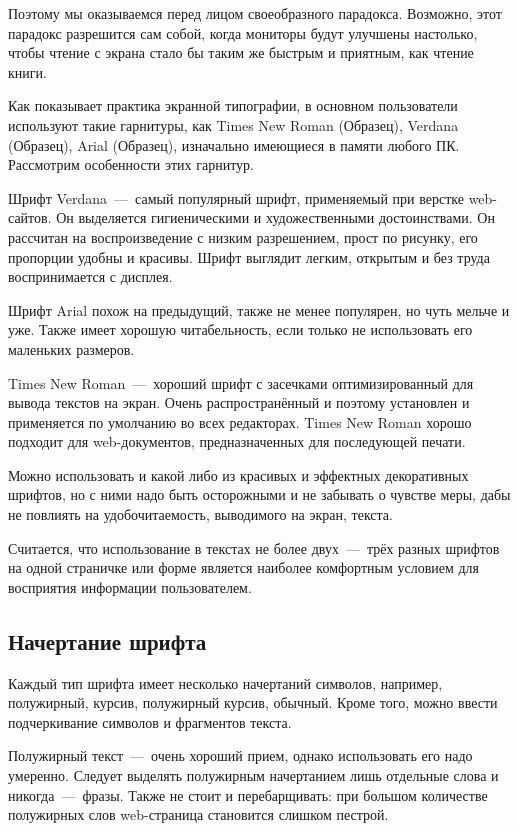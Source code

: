 \documentclass[14pt]{extarticle}
\begin{document}
Поэтому мы оказываемся перед лицом своеобразного парадокса. Возможно, этот парадокс разрешится сам собой, когда мониторы будут улучшены настолько, чтобы чтение с экрана стало бы таким же быстрым и приятным, как чтение книги.

Как показывает практика экранной типографии, в основном пользователи используют такие гарнитуры, как Times New Roman (Образец), Verdana (Образец), Arial (Образец), изначально имеющиеся в памяти любого ПК. Рассмотрим особенности этих гарнитур.

Шрифт Verdana~---~самый популярный шрифт, применяемый при верстке web-сайтов. Он выделяется гигиеническими и художественными достоинствами. Он рассчитан на воспроизведение с низким разрешением, прост по рисунку, его пропорции удобны и красивы. Шрифт выглядит легким, открытым и без труда воспринимается с дисплея.

Шрифт Arial похож на предыдущий, также не менее популярен, но чуть мельче и уже. Также имеет хорошую читабельность, если только не использовать его маленьких размеров.

Times New Roman~---~хороший шрифт с засечками оптимизированный для вывода текстов на экран. Очень распространённый и поэтому установлен и применяется по умолчанию во всех редакторах. Times New Roman хорошо подходит для web-документов, предназначенных для последующей печати.

Можно использовать и какой либо из красивых и эффектных декоративных шрифтов, но с ними надо быть осторожными и не забывать о чувстве меры, дабы не повлиять на удобочитаемость, выводимого на экран, текста.

Считается, что использование в текстах не более двух~---~трёх разных шрифтов на одной страничке или форме является наиболее комфортным условием для восприятия информации пользователем.

\subsection{Начертание шрифта}

Каждый тип шрифта имеет несколько начертаний символов, например, полужирный, курсив, полужирный курсив, обычный. Кроме того, можно ввести подчеркивание символов и фрагментов текста.

Полужирный текст~---~очень хороший прием, однако использовать его надо умеренно. Следует выделять полужирным начертанием лишь отдельные слова и никогда~---~фразы. Также не стоит и перебарщивать: при большом количестве полужирных слов web-страница становится слишком пестрой.
\end{document}
